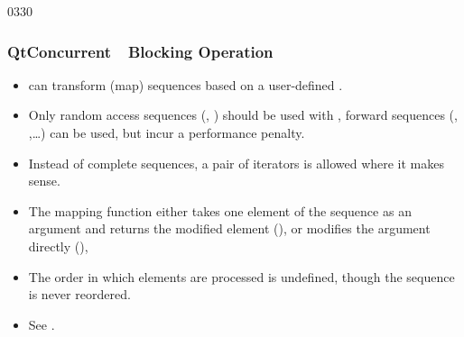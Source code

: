 \begin{slide}{0330}
\frametitle{QtConcurrent~\textemdash~Blocking Operation}
  \begin{itemize}
  \item {} can transform (map) sequences based on a
    user-defined \emph{}.
  \item Only random access sequences (, )
    should be used with , forward sequences
    (, ,\ldots) can be used, but incur a
    performance penalty.
  \item Instead of complete sequences, a pair of iterators is allowed
    where it makes sense.
  \item The mapping function either takes one element of the sequence
    as an argument and returns the modified element
    (), or modifies the argument directly
    (),
  \item The order in which elements are processed is undefined, though
    the sequence is never reordered.
  \item See .
  \end{itemize}
\end{slide}

